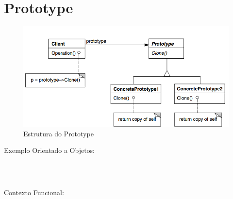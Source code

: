 \section{Prototype}

\begin{figure}[htb]
	\caption{\label{prototype_struct}Estrutura do Prototype}
	\begin{center}
	    \includegraphics[scale=0.5]{5_padroes-contexto-funcional/5.1_criacionais/5.1.4_prototype/diagram.png}
	\end{center}
\end{figure}

Exemplo Orientado a Objetos:

\begin{lstlisting}[caption={Prototype Orientado a Objetos},label=ooprototype]



\end{lstlisting}

Contexto Funcional:


\begin{lstlisting}[caption={Prototype Funcional},label=fpprototype]
    

    
\end{lstlisting}